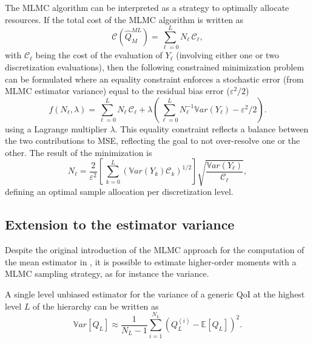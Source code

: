 The MLMC algorithm can be interpreted as a strategy to optimally allocate 
resources. If the total cost of the MLMC algorithm is written as  
\begin{equation}\label{EQ: MLMC cost}
\mathcal{C}(\hat{Q}^{ML}_{M}) = \sum_{\ell=0}^{L} N_\ell \, \mathcal{C}_{\ell},
\end{equation}
with $\mathcal{C}_{\ell}$ being the cost of the evaluation of $Y_\ell$ (involving either one or two discretization evaluations), then the following constrained minimization problem can be formulated where an equality constraint enforces a stochastic error (from MLMC estimator variance) equal to the residual bias error ($\varepsilon^2/2$)
\begin{equation}\label{EQ:mlmc_optimization}
 f(N_\ell,\lambda) = \sum_{\ell=0}^{L} N_\ell \, \mathcal{C}_{\ell} 
                   + \lambda \left( \sum_{\ell=0}^{L} N_\ell^{-1} \mathbb{V}ar\left({Y_\ell}\right) - \varepsilon^2/2 \right). 
\end{equation}
using a Lagrange multiplier $\lambda$.  This equality constraint reflects a balance between the two contributions to MSE, reflecting the goal to not over-resolve one or the other.  The result of the minimization is
\begin{equation}\label{EQ: MLMC nl}
N_{\ell} = \frac{2}{\varepsilon^2} \left[ \, \sum_{k=0}^L \left( \mathbb{V}ar\left(Y_k\right) \mathcal{C}_k \right)^{1/2} \right] 
               \sqrt{\frac{ \mathbb{V}ar\left({Y_\ell}\right) }{\mathcal{C}_{\ell}}},
\end{equation}
defining an optimal sample allocation per discretization level.

\subsection{Extension to the estimator variance}
Despite the original introduction of the MLMC approach for the computation of the mean estimator in \cite{Giles2008,Giles2015}, it is 
possible to estimate higher-order moments with a MLMC sampling strategy, as for instance the variance.

A single level unbiased estimator for the variance of a generic QoI at the highest level $L$ of the hierarchy can be written as
\begin{equation}
\label{eq: variance_est_single_level}
 \mathbb{V}ar\left[Q_L\right] \approx \frac{1}{N_L - 1} \sum_{i=1}^{N_L} \left( Q_L^{(i)} - \mathbb{E}\left[Q_L\right] \right)^2.
\end{equation}

